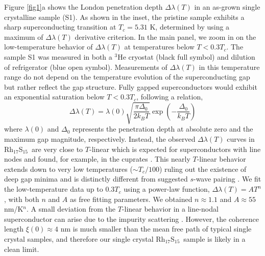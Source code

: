 \documentclass[aps,pra,reprint,superscriptaddress,floatfix]{revtex4-2}
\newcommand{\rhs}{Rh$_{17}$S$_{15}$}
\begin{document}
Figure \ref{fig1}a shows 
the London penetration depth $\Delta \lambda(T)$ in an as-grown single crystalline sample (S1). As shown in the inset, the pristine sample exhibits a sharp superconducting transition at $T_c=5.31$ K,  determined by using a maximum of $\Delta\lambda(T)$ derivative criterion. 
In the main panel, we zoom in on the low-temperature behavior of $\Delta \lambda(T)$ at temperatures below $T<0.3T_c$. The sample S1 was measured in both a $^3$He cryostat (black full symbol) and {dilution of refrigerator} \cite{RSI} (blue open symbol). 
{Measurements of $\Delta \lambda(T)$} in this temperature range do not depend on the temperature evolution of the superconducting gap but rather reflect the gap structure.  
Fully gapped superconductors would exhibit an exponential saturation below $T<0.3T_c$, following a relation,
\begin{equation}\label{eq:swave}
   \Delta\lambda(T)=\lambda(0) \sqrt{\frac{\pi \Delta_0}{2k_BT}} \exp{\left(-\frac{\Delta_0}{k_BT}\right)} 
\end{equation}
where $\lambda(0)$ and $\Delta_0$ represents the penetration depth at absolute zero and the maximum gap magnitude, respectively.
Instead, the observed $\Delta\lambda(T)$ curves in \rhs~are very close to $T$-linear which is expected for superconductors with line nodes and found, for example, in the cuprates \cite{Hardy1993}. This nearly $T$-linear behavior extends down to very low temperatures ($\sim T_c/100$) ruling out the existence of deep gap minima and is distinctly different from suggested $s$-wave pairing \cite{Koyama2010}. 
We fit the low-temperature data up to $0.3T_c$ using a power-law function, $\Delta\lambda(T)=AT^n$, with both $n$ and $A$ as free fitting parameters. 
We obtained $n\approx 1.1$ and $A\approx 55$ nm/K$^n$. 
A small deviation from the $T$-linear behavior in a line-nodal superconductor can arise due to the impurity scattering \cite{Hirschfeld1993, Cho2022}.
However, the coherence length $\xi(0)\approx 4$ nm \cite{Settai2010} is much smaller than the mean free path of typical single crystal samples, and therefore our single crystal \rhs~sample is likely in a clean limit.
\end{document}
